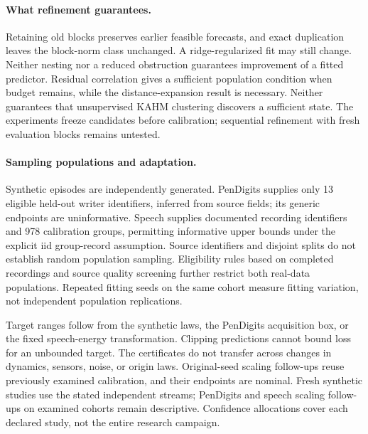 \paragraph{What refinement guarantees.}
Retaining old blocks preserves earlier feasible forecasts, and exact
duplication leaves the block-norm class unchanged. A ridge-regularized fit may
still change. Neither nesting nor a reduced obstruction guarantees improvement
of a fitted predictor. Residual correlation gives a sufficient population
condition when budget remains, while the distance-expansion result is
necessary. Neither guarantees that unsupervised KAHM clustering discovers a
sufficient state. The experiments freeze candidates before calibration;
sequential refinement with fresh evaluation blocks remains untested.

\paragraph{Sampling populations and adaptation.}
Synthetic episodes are independently generated. PenDigits supplies only 13
eligible held-out writer identifiers, inferred from source fields; its
generic endpoints are uninformative. Speech supplies documented recording
identifiers and 978 calibration groups, permitting informative upper bounds
under the explicit iid group-record assumption. Source identifiers and
disjoint splits do not establish random population sampling. Eligibility
rules based on completed recordings and source quality screening further
restrict both real-data populations. Repeated fitting seeds on the same
cohort measure fitting variation, not independent population replications.

Target ranges follow from the synthetic laws, the PenDigits acquisition box,
or the fixed speech-energy transformation. Clipping predictions cannot bound
loss for an unbounded target. The certificates do not transfer across
changes in dynamics, sensors, noise, or origin laws. Original-seed scaling
follow-ups reuse previously examined calibration, and their endpoints are
nominal. Fresh synthetic studies use the stated independent streams;
PenDigits and speech scaling follow-ups on examined cohorts remain
descriptive. Confidence allocations cover each declared study, not the
entire research campaign.

